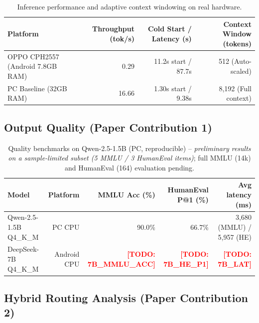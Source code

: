 \documentclass[11pt]{article}
\newcommand{\TODO}[1]{\textcolor{red}{\textbf{[TODO: #1]}}}
\begin{document}
\begin{table}[h]
\centering
\caption{Inference performance and adaptive context windowing on real hardware.}
\label{tab:tps}
\begin{tabular}{lrrr}
\toprule
Platform & Throughput (tok/s) & Cold Start / Latency (s) & Context Window (tokens) \\
\midrule
OPPO CPH2557 (Android 7.8GB RAM) & 0.29 & 11.2s start / 87.7s & 512 (Auto-scaled) \\
PC Baseline (32GB RAM) & 16.66 & 1.30s start / 9.38s & 8,192 (Full context) \\
\bottomrule
\end{tabular}
\end{table}

\subsection{Output Quality (Paper Contribution 1)}
\label{sec:quality}

\begin{table}[h]
\centering
\caption{Quality benchmarks on Qwen-2.5-1.5B (PC, reproducible) -- \emph{preliminary results on a sample-limited subset (5 MMLU / 3 HumanEval items)}; full MMLU (14k) and HumanEval (164) evaluation pending.}
\label{tab:quality}
\begin{tabular}{lrrrr}
\toprule
Model & Platform & MMLU Acc (\%) & HumanEval P@1 (\%) & Avg latency (ms) \\
\midrule
Qwen-2.5-1.5B Q4\_K\_M & PC CPU & 90.0\% & 66.7\% & 3,680 (MMLU) / 5,957 (HE) \\
DeepSeek-7B Q4\_K\_M   & Android CPU & \TODO{7B_MMLU_ACC} & \TODO{7B_HE_P1} & \TODO{7B_LAT} \\
\bottomrule
\end{tabular}
\end{table}

\subsection{Hybrid Routing Analysis (Paper Contribution 2)}
\label{sec:routing_results}
\end{document}
